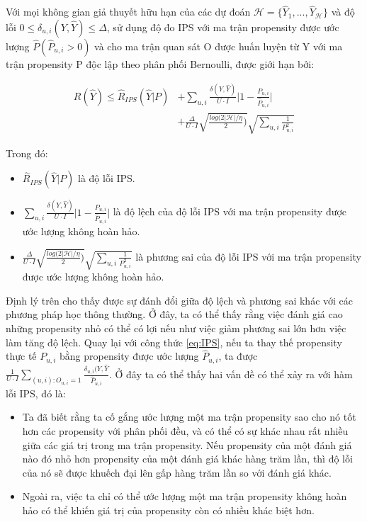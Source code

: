 \begin{theorem}
    Với mọi không gian giả thuyết hữu hạn của các dự đoán $\mathcal{H} = \{\hat{Y}_1,...,\hat{Y}_{\mathcal{H}}\}$ và độ lỗi $0 \leqslant \delta_{u,i}(Y,\hat{Y}) \leqslant \Delta$, sử dụng độ đo IPS với ma trận propensity được ước lượng $\hat{P} (\hat{P}_{u,i} > 0)$ và cho ma trận quan sát O được huấn luyện từ Y với ma trận propensity P độc lập theo phân phối Bernoulli, được giới hạn bởi:
    
    \begin{equation}
    \begin{aligned}
        \label{eq:bound_erm}
        R(\hat{Y}) \leqslant \hat{R}_{IPS}(\hat{Y}|P) 
        & + \sum_{u,i} \frac{\delta(Y, \hat{Y})}{U \cdot I} \Bigg|1-\frac{P_{u,i}}{\hat{P}_{u,i}}\Bigg| \\ &+ \frac{\Delta}{U \cdot I} \sqrt{\frac{log(2|\mathcal{H}| / \eta}{2})} \sqrt{\sum_{u,i} \frac{1}{P^2_{u,i}}}
    \end{aligned}
    \end{equation}
    
\end{theorem}
Trong đó:
\begin{itemize}
    \item $\hat{R}_{IPS}(\hat{Y}|P)$ là độ lỗi IPS.
    \item $\sum_{u,i} \frac{\delta(Y, \hat{Y})}{U \cdot I} \Bigg|1-\frac{P_{u,i}}{\hat{P}_{u,i}}\Bigg|$ là độ lệch của độ lỗi IPS với ma trận propensity được ước lượng không hoàn hảo.
    \item $\frac{\Delta}{U \cdot I} \sqrt{\frac{log(2|\mathcal{H}| / \eta}{2})} \sqrt{\sum_{u,i} \frac{1}{P^2_{u,i}}}$ là phương sai của độ lỗi IPS với ma trận propensity được ước lượng không hoàn hảo.
\end{itemize}
Định lý trên cho thấy được sự đánh đổi giữa độ lệch và phương sai khác với các phương pháp học thông thường. Ở đây, ta có thể thấy rằng việc đánh giá cao những propensity nhỏ có thể có lợi nếu như việc giảm phương sai lớn hơn việc làm tăng độ lệch. Quay lại với công thức \ref{eq:IPS}, nếu ta thay thế propensity thực tế $P_{u,i}$ bằng propensity được ước lượng $\hat{P}_{u,i}$, ta được  $ \frac{1}{U \cdot I} \sum_{(u,i): O_{u,i} = 1} \frac{\delta_{u,i}(Y, \hat{Y}}{\hat{P}_{u,i}}$. Ở đây ta có thể thấy hai vấn đề có thể xảy ra với hàm lỗi IPS, đó là:
\begin{itemize}
    \item Ta đã biết rằng ta cố gắng ước lượng một ma trận propensity sao cho nó tốt hơn các propensity với phân phối đều, và có thể có sự khác nhau rất nhiều giữa các giá trị trong ma trận propensity. Nếu propensity của một đánh giá nào đó nhỏ hơn propensity của một đánh giá khác hàng trăm lần, thì độ lỗi của nó sẽ được khuếch đại lên gấp hàng trăm lần so với đánh giá khác.
    \item Ngoài ra, việc ta chỉ có thể ước lượng một ma trận propensity không hoàn hảo có thể khiến giá trị của propensity còn có nhiều khác biệt hơn.
\end{itemize}

